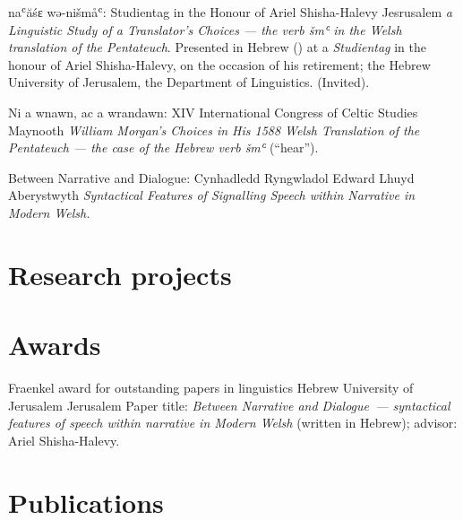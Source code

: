 	{na{ʿ}ăśɛ wə-nišmå{ʿ}:}
	{Studientag in the Honour of Ariel Shisha-Halevy}
	{Jesrusalem}
	{}
	{\emph{a Linguistic Study of a Translator’s Choices — the verb \emph{šm{ʿ}} in the Welsh translation of the Pentateuch}. Presented in Hebrew () at a \emph{Studientag} in the honour of Ariel Shisha-Halevy, on the occasion of his retirement; the Hebrew University of Jerusalem, the Department of Linguistics. (Invited).}

	{Ni a wnawn, ac a wrandawn:}
	{XIV International Congress of Celtic Studies}
	{Maynooth}
	{}
	{\emph{William Morgan’s Choices in His 1588 Welsh Translation of the Pentateuch — the case of the Hebrew verb \emph{šm{ʿ}}} (“hear”).}

	{Between Narrative and Dialogue:}
	{Cynhadledd Ryngwladol Edward Lhuyd}
	{Aberystwyth}
	{}
	{\emph{Syntactical Features of Signalling Speech within Narrative in Modern Welsh.}}



\section{Research projects}




\section{Awards}

	{Fraenkel award for outstanding papers in linguistics}
	{Hebrew University of Jerusalem}
	{Jerusalem}
	{}
	{Paper title: \emph{Between Narrative and Dialogue~— syntactical features of speech within narrative in Modern Welsh} (written in Hebrew); advisor: Ariel Shisha-Halevy.}



\section{Publications}

\nocite{*}
\printbibliography[keyword=text, heading=subbibliography, title={Editing, collecting, digitising and typesetting texts}]
\printbibliography[keyword=music, heading=subbibliography, title={Editing, collecting, digitising and engraving music}]


